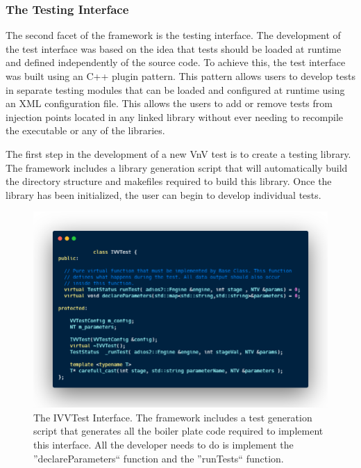 \subsubsection{The Testing Interface} 

The second facet of the framework is the \VV testing interface. The development of the 
test interface was based on the idea that tests should be loaded at runtime and defined independently of the source code. To achieve this, the test
interface was built using an C++ plugin pattern. This pattern allows users to develop tests in separate testing modules that can be loaded and configured 
at runtime using an XML configuration file. This allows the users to add or remove tests from injection points located in any linked library without ever 
needing to recompile the executable or any of the libraries. 

The first step in the development of a new VnV test is to create a testing library. The framework includes a library generation script that will automatically build the directory structure and makefiles required to 
build this library. Once the library has been initialized, the user can begin to develop individual tests. 


\begin{figure}
 \includegraphics[width=\textwidth]{./Figures/test-interface.png}
 \caption{The IVVTest Interface. The framework includes a test generation script that generates all the boiler plate code required to implement this interface. All the developer
 needs to do is implement the ''declareParameters`` function and the ''runTests`` function. \label{test-inter}} 
\end{figure}



